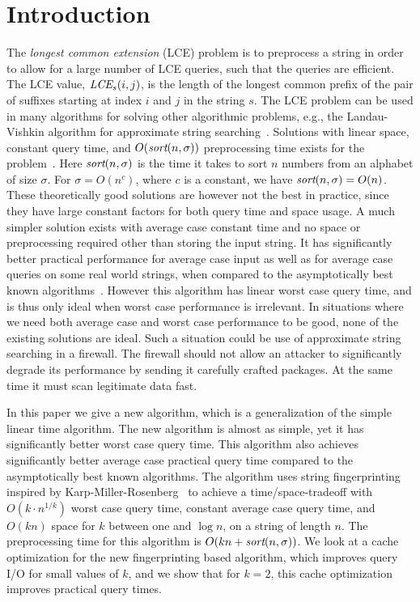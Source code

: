 \documentclass[a4]{article}
\begin{document}
\section{Introduction\label{sec:intro}}

The \emph{longest common extension} (LCE) problem is to preprocess a string in order to allow for a large number of LCE queries, such that the queries are efficient. The LCE value, $\textit{LCE}_s(i,j)$, is the length of the longest common prefix of the pair of suffixes starting at index $i$ and $j$ in the string $s$. The LCE problem can be used in many algorithms for solving other algorithmic problems, e.g., the Landau-Vishkin algorithm for approximate string searching~\cite{approx-search}. Solutions with linear space, constant query time, and $O(\textit{sort}(n,\sigma))$ preprocessing time exists for the problem~\cite{nca,jf-rmq}. Here $\textit{sort}(n,\sigma)$ is the time it takes to sort $n$ numbers from an alphabet of size $\sigma$. For $\sigma=O(n^c)$, where $c$ is a constant, we have $\textit{sort}(n,\sigma)=O(n)$. These theoretically good solutions are however not the best in practice, since they have large constant factors for both query time and space usage. A much simpler solution exists with average case constant time and no space or preprocessing required other than storing the input string. It has significantly better practical performance for average case input as well as for average case queries on some real world strings, when compared to the asymptotically best known algorithms~\cite{ilie-navarro-tinta}. However this algorithm has linear worst case query time, and is thus only ideal when worst case performance is irrelevant. In situations where we need both average case and worst case performance to be good, none of the existing solutions are ideal. Such a situation could be use of approximate string searching in a firewall. The firewall should not allow an attacker to significantly degrade its performance by sending it carefully crafted packages. At the same time it must scan legitimate data fast.

In this paper we give a new algorithm, which is a generalization of the simple linear time algorithm. The new algorithm is almost as simple, yet it has significantly better worst case query time. This algorithm also achieves significantly better average case practical query time compared to the asymptotically best known algorithms. The algorithm uses string fingerprinting inspired by Karp-Miller-Rosenberg~\cite{karp-miller-rosenberg} to achieve a time/space-tradeoff with $O(k\cdot n^{1/k})$ worst case query time, constant average case query time, and $O(kn)$ space for $k$ between one and $\log n$, on a string of length $n$. The preprocessing time for this algorithm is $O(kn+\textit{sort}(n,\sigma))$. We look at a cache optimization for the new fingerprinting based algorithm, which improves query I/O for small values of $k$, and we show that for $k=2$, this cache optimization improves practical query times.
\end{document}
